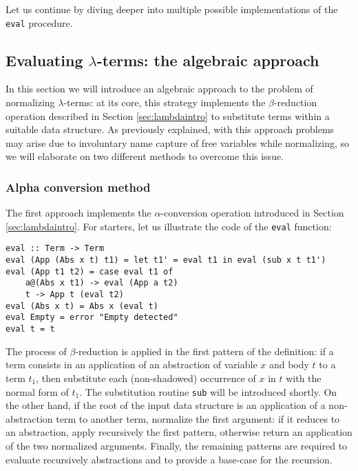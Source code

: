 \documentclass{article}
\begin{document}
Let us continue by diving deeper into multiple possible implementations of the \lstinline|eval| procedure.

\subsection{Evaluating $\lambda$-terms: the algebraic approach} \label{sec:algebraic}

In this section we will introduce an algebraic approach to the problem of normalizing $\lambda$-terms: at its core, this strategy implements the $\beta$-reduction operation described in Section \ref{sec:lambdaintro} to substitute terms within a suitable data structure. As previously explained, with this approach problems may arise due to involuntary name capture of free variables while normalizing, so we will elaborate on two different methods to overcome this issue.

\subsubsection{Alpha conversion method}

The first approach implements the $\alpha$-conversion operation introduced in Section \ref{sec:lambdaintro}. For starters, let us illustrate the code of the \lstinline|eval| function:

\begin{lstlisting}
eval :: Term -> Term
eval (App (Abs x t) t1) = let t1' = eval t1 in eval (sub x t t1')
eval (App t1 t2) = case eval t1 of
    a@(Abs x t1) -> eval (App a t2)
    t -> App t (eval t2)
eval (Abs x t) = Abs x (eval t)
eval Empty = error "Empty detected"
eval t = t
\end{lstlisting}

The process of $\beta$-reduction is applied in the first pattern of the definition: if a term consists in an application of an abstraction of variable $x$ and body $t$ to a term $t_1$, then substitute each (non-shadowed) occurrence of $x$ in $t$ with the normal form of $t_1$. The substitution routine \lstinline|sub| will be introduced shortly. On the other hand, if the root of the input data structure is an application of a non-abstraction term to another term, normalize the first argument: if it reduces to an abstraction, apply recursively the first pattern, otherwise return an application of the two normalized arguments. Finally, the remaining patterns are required to evaluate recursively abstractions and to provide a base-case for the recursion.
\end{document}

